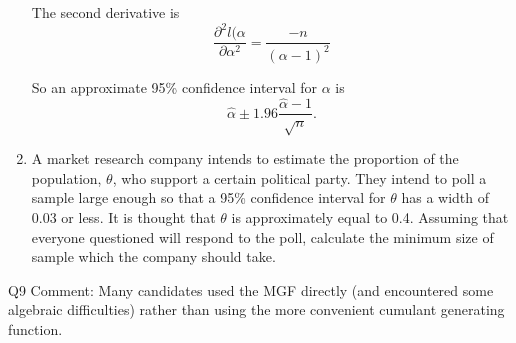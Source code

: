 \documentclass[a4paper,12pt]{article}
\begin{document}
\begin{enumerate}
The second derivative is
\[ \frac{\partial^2 l(\alpha}{ \partial \alpha^2} = \frac{-n}{(\alpha -1)^2} \]

So an approximate 95\% confidence interval for $\alpha$ is 
\[ \hat{\alpha} \pm  1.96 \frac{\hat{\alpha} - 1}{\sqrt{n}} .\]

\newpage
\item A market research company intends to estimate the proportion of the population,
$\theta$, who support a certain political party. They intend to poll a sample large
enough so that a 95\% confidence interval for $\theta$ has a width of 0.03 or less. It is
thought that $\theta$ is approximately equal to 0.4.
Assuming that everyone questioned will respond to the poll, calculate the
minimum size of sample which the company should take. 
\end{enumerate}
Q9 Comment: Many candidates used the MGF directly (and encountered some
algebraic difficulties) rather than using the more convenient cumulant generating
function.
\newpage %
\end{document}
